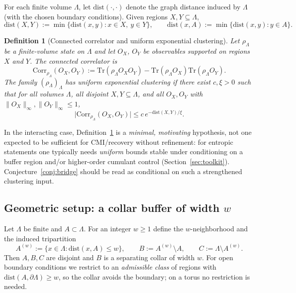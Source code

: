 \documentclass[11pt]{article}
\newtheorem{definition}{Definition}
\newcommand{\dist}{\mathrm{dist}}
\newcommand{\Corr}{\mathrm{Corr}}
\newcommand{\Tr}{\mathrm{Tr}}
\begin{document}
For each finite volume $\Lambda$, let $\dist(\cdot,\cdot)$ denote the graph
distance induced by $\Lambda$ (with the chosen boundary conditions). Given
regions $X, Y \subseteq \Lambda$,
\begin{equation}
\dist(X,Y) := \min\{\dist(x,y) : x \in X,\ y \in Y\},
\qquad
\dist(x,A) := \min\{\dist(x,y) : y \in A\}.
\end{equation}

\begin{definition}[Connected correlator and uniform exponential clustering]
\label{def:clustering}
Let $\rho_\Lambda$ be a finite-volume state on $\Lambda$ and let $O_X$, $O_Y$
be observables supported on regions $X$ and $Y$. The connected correlator is
\begin{equation}
\Corr_{\rho_\Lambda}(O_X,O_Y) := \Tr(\rho_\Lambda O_X O_Y)
 - \Tr(\rho_\Lambda O_X)\Tr(\rho_\Lambda O_Y).
\end{equation}
The family $(\rho_\Lambda)_\Lambda$ has \emph{uniform exponential clustering}
if there exist $c, \xi > 0$ such that for all volumes $\Lambda$, all disjoint
$X, Y \subseteq \Lambda$, and all $O_X, O_Y$ with
$\|O_X\|_\infty, \|O_Y\|_\infty \le 1$,
\begin{equation}
\bigl|\Corr_{\rho_\Lambda}(O_X,O_Y)\bigr| \le c\, e^{-\dist(X,Y)/\xi}.
\end{equation}
\end{definition}

In the interacting case, Definition~\ref{def:clustering} is a
\emph{minimal, motivating} hypothesis, not one expected to be sufficient for
CMI/recovery without refinement: for entropic statements one typically needs
\emph{uniform} bounds stable under conditioning on a buffer region and/or
higher-order cumulant control (Section~\ref{sec:toolkit}). Conjecture~\ref{conj:bridge}
should be read as conditional on such a strengthened clustering input.

\subsection{Geometric setup: a collar buffer of width $w$}

Let $\Lambda$ be finite and $A \subset \Lambda$. For an integer $w \ge 1$
define the $w$-neighborhood and the induced tripartition
\begin{equation}
A^{(w)} := \{x \in \Lambda : \dist(x,A) \le w\},
\qquad
B := A^{(w)} \setminus A, \qquad C := \Lambda \setminus A^{(w)}.
\label{eq:collar}
\end{equation}
Then $A,B,C$ are disjoint and $B$ is a separating collar of width $w$. For
open boundary conditions we restrict to an \emph{admissible class} of regions
with $\dist(A,\partial\Lambda) \ge w$, so the collar avoids the boundary; on a
torus no restriction is needed.
\end{document}

